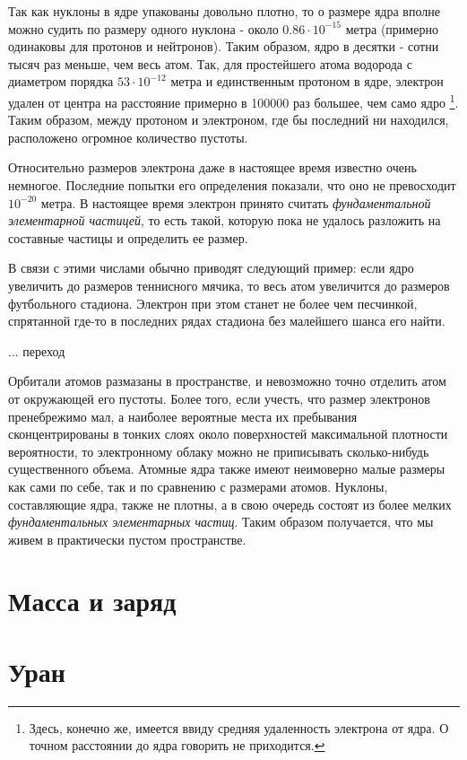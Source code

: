 Так как нуклоны в ядре упакованы довольно плотно, то о размере ядра вполне можно судить по размеру одного нуклона - около $0.86\cdot 10^{-15}$ метра (примерно одинаковы для протонов и нейтронов). 
Таким образом, ядро в десятки - сотни тысяч раз меньше, чем весь атом.
Так, для простейшего атома водорода с диаметром порядка $53\cdot 10^{-12}$ метра и единственным протоном в ядре, электрон удален от центра на расстояние примерно в 100000 раз большее, чем само ядро \footnote{%
    Здесь, конечно же, имеется ввиду средняя удаленность электрона от ядра.
    О точном расстоянии до ядра говорить не приходится.}.
Таким образом, между протоном и электроном, где бы последний ни находился, расположено огромное количество пустоты.

Относительно размеров электрона даже в настоящее время известно очень немногое.
Последние попытки его определения показали, что оно не превосходит $10^{-20}$ метра.
В настоящее время электрон принято считать \textit{фундаментальной элементарной частицей}, то есть такой, которую пока не удалось разложить на составные частицы и определить ее размер.

В связи с этими числами обычно приводят следующий пример: если ядро увеличить до размеров теннисного мячика, то весь атом увеличится до размеров футбольного стадиона.
Электрон при этом станет не более чем песчинкой, спрятанной где-то в последних рядах стадиона без малейшего шанса его найти.

... переход

Орбитали атомов размазаны в пространстве, и невозможно точно отделить атом от окружающей его пустоты.
Более того, если учесть, что размер электронов пренебрежимо мал, а наиболее вероятные места их пребывания сконцентрированы в тонких слоях около поверхностей максимальной плотности вероятности, то электронному облаку можно не приписывать сколько-нибудь существенного объема.
Атомные ядра также имеют неимоверно малые размеры как сами по себе, так и по сравнению с размерами атомов.
Нуклоны, составляющие ядра, также не плотны, а в свою очередь состоят из более мелких \textit{фундаментальных элементарных частиц}.
Таким образом получается, что мы живем в практически пустом пространстве.


\section*{Масса и заряд}


\section*{Уран}

